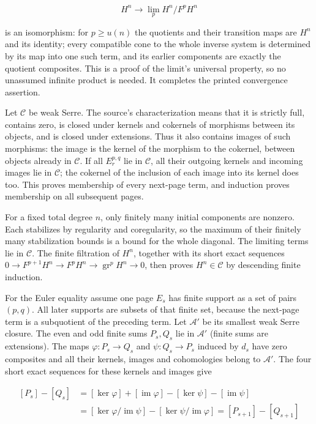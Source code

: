 \[
H^n\longrightarrow\lim_p H^n/F^pH^n
\]

is an isomorphism: for \(p\geq u(n)\) the quotients and their transition maps are \(H^n\) and its identity; every compatible cone to the whole inverse system is determined by its map into one such term, and its earlier components are exactly the quotient composites. This is a proof of the limit's universal property, so no unassumed infinite product is needed. It completes the printed convergence assertion.

Let \(\mathcal C\) be weak Serre. The source's characterization means that it is strictly full, contains zero, is closed under kernels and cokernels of morphisms between its objects, and is closed under extensions. Thus it also contains images of such morphisms: the image is the kernel of the morphism to the cokernel, between objects already in \(\mathcal C\). If all \(E_r^{p,q}\) lie in \(\mathcal C\), all their outgoing kernels and incoming images lie in \(\mathcal C\); the cokernel of the inclusion of each image into its kernel does too. This proves membership of every next-page term, and induction proves membership on all subsequent pages.

For a fixed total degree \(n\), only finitely many initial components are nonzero. Each stabilizes by regularity and coregularity, so the maximum of their finitely many stabilization bounds is a bound for the whole diagonal. The limiting terms lie in \(\mathcal C\). The finite filtration of \(H^n\), together with its short exact sequences \(0\to F^{p+1}H^n\to F^pH^n\to\operatorname{gr}^pH^n\to0\), then proves \(H^n\in\mathcal C\) by descending finite induction.

For the Euler equality assume one page \(E_s\) has finite support as a set of pairs \((p,q)\). All later supports are subsets of that finite set, because the next-page term is a subquotient of the preceding term. Let \(\mathcal A'\) be its smallest weak Serre closure. The even and odd finite sums \(P_s,Q_s\) lie in \(\mathcal A'\) (finite sums are extensions). The maps \(\varphi:P_s\to Q_s\) and \(\psi:Q_s\to P_s\) induced by \(d_s\) have zero composites and all their kernels, images and cohomologies belong to \(\mathcal A'\). The four short exact sequences for these kernels and images give

\[
\begin{aligned}
[P_s]-[Q_s]
&=[\ker\varphi]+[\operatorname{im}\varphi]
 -[\ker\psi]-[\operatorname{im}\psi]\\
&=[\ker\varphi/\operatorname{im}\psi]
 -[\ker\psi/\operatorname{im}\varphi]
=[P_{s+1}]-[Q_{s+1}]
\end{aligned}                                             \tag{2.2}
\]

